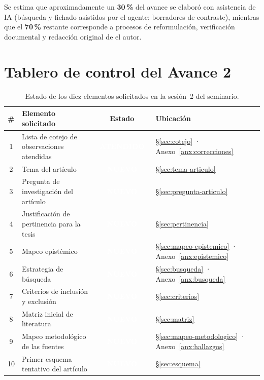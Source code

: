 \documentclass[letter,12pt]{article}
\newcommand{\bOK}{\colorbox{colorPropuesto}{\textcolor{white}{\scriptsize\textbf{~ATENDIDO~}}}}
\newcommand{\bNVO}{\colorbox{colorConservado}{\textcolor{white}{\scriptsize\textbf{~NUEVO~}}}}
\begin{document}
\begin{description}[style=nextline, leftmargin=0.5cm, labelsep=0.2cm]
        \item[\textbf{Distribución de la producción:}]
        Se estima que aproximadamente un \textbf{30\,\%} del avance se elaboró con asistencia de IA (búsqueda y fichado asistidos por el agente; borradores de contraste), mientras que el \textbf{70\,\%} restante corresponde a procesos de reformulación, verificación documental y redacción original de el autor.

    \end{description}
\vspace*{\fill}
\clearpage

\section*{Tablero de control del Avance 2}

\begin{table}[H]
\centering
\footnotesize
\caption{Estado de los diez elementos solicitados en la sesión~2 del seminario.}
\label{tab:tablero}
\renewcommand{\arraystretch}{1.28}
\begin{tabular}{|c|p{6.0cm}|c|p{3.4cm}|}
\hline
\rowcolor{bgCotejo}
\textbf{\#} & \textbf{Elemento solicitado} & \textbf{Estado} & \textbf{Ubicación} \\
\hline
1 & Lista de cotejo de observaciones atendidas & \bOK & \S\ref{sec:cotejo} · Anexo~\ref{anx:correcciones} \\
\hline
2 & Tema del artículo & \bNVO & \S\ref{sec:tema-articulo} \\
\hline
3 & Pregunta de investigación del artículo & \bNVO & \S\ref{sec:pregunta-articulo} \\
\hline
4 & Justificación de pertinencia para la tesis & \bNVO & \S\ref{sec:pertinencia} \\
\hline
5 & Mapeo epistémico & \bNVO & \S\ref{sec:mapeo-epistemico} · Anexo~\ref{anx:epistemico} \\
\hline
6 & Estrategia de búsqueda & \bNVO & \S\ref{sec:busqueda} · Anexo~\ref{anx:busqueda} \\
\hline
7 & Criterios de inclusión y exclusión & \bNVO & \S\ref{sec:criterios} \\
\hline
8 & Matriz inicial de literatura & \bNVO & \S\ref{sec:matriz} \\
\hline
9 & Mapeo metodológico de las fuentes & \bNVO & \S\ref{sec:mapeo-metodologico} · Anexo~\ref{anx:hallazgos} \\
\hline
10 & Primer esquema tentativo del artículo & \bNVO & \S\ref{sec:esquema} \\
\hline
\end{tabular}
\end{table}
\end{document}
